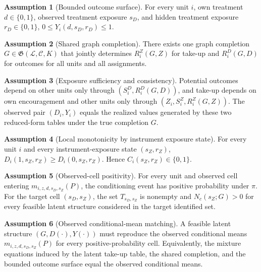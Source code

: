 \documentclass[11pt]{article}
\theoremstyle{definition}
\newtheorem{assumption}{Assumption}
\theoremstyle{plain}
\theoremstyle{remark}
\begin{document}
\begin{assumption}[Bounded outcome surface]\label{ass:bounded}
For every unit \(i\), own treatment \(d\in\{0,1\}\), observed treatment exposure \(s_D\), and hidden treatment exposure \(r_D\in\{0,1\}\), \(0\le Y_i(d,s_D,r_D)\le 1\).
\end{assumption}

\begin{assumption}[Shared graph completion]\label{ass:shared}
There exists one graph completion \(G\in\mathfrak G(\mathcal L,\mathcal C,K)\) that jointly determines \(R_i^Z(G,Z)\) for take-up and \(R_i^D(G,D)\) for outcomes for all units and all assignments.
\end{assumption}

\begin{assumption}[Exposure sufficiency and consistency]\label{ass:consistency}
Potential outcomes depend on other units only through \((S_i^D,R_i^D(G,D))\), and take-up depends on own encouragement and other units only through \((Z_i,S_i^Z,R_i^Z(G,Z))\). The observed pair \((D_i,Y_i)\) equals the realized values generated by these two reduced-form tables under the true completion \(G\).
\end{assumption}

\begin{assumption}[Local monotonicity by instrument exposure state]\label{ass:monotonicity}
For every unit \(i\) and every instrument-exposure state \((s_Z,r_Z)\), \(D_i(1,s_Z,r_Z)\ge D_i(0,s_Z,r_Z)\). Hence \(C_i(s_Z,r_Z)\in\{0,1\}\).
\end{assumption}

\begin{assumption}[Observed-cell positivity]\label{ass:positivity}
For every unit and observed cell entering \(m_{i,z,d,s_D,s_Z}(P)\), the conditioning event has positive probability under \(\pi\). For the target cell \((s_D,s_Z)\), the set \(T_{s_D,s_Z}\) is nonempty and \(N_c(s_Z;G)>0\) for every feasible latent structure considered in the target identified set.
\end{assumption}

\begin{assumption}[Observed conditional-mean matching]\label{ass:matching}
A feasible latent structure \((G,D(\cdot),Y(\cdot))\) must reproduce the observed conditional means \(m_{i,z,d,s_D,s_Z}(P)\) for every positive-probability cell. Equivalently, the mixture equations induced by the latent take-up table, the shared completion, and the bounded outcome surface equal the observed conditional means.
\end{assumption}
\end{document}
